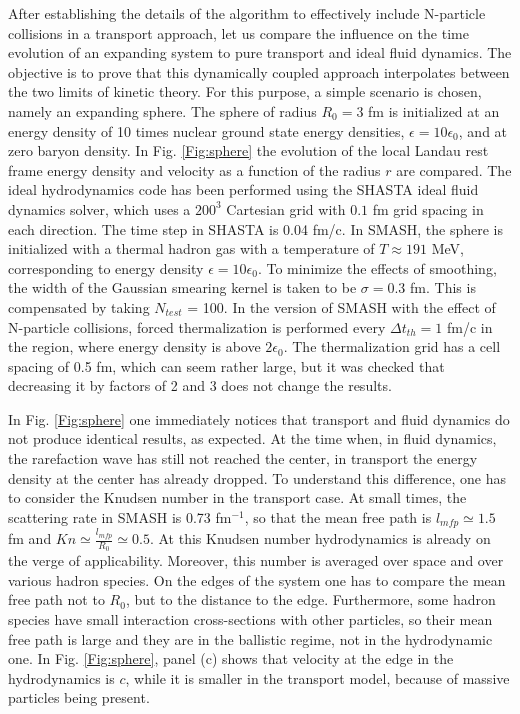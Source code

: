 After establishing the details of the algorithm to effectively include
N-particle collisions in a transport approach, let us compare the influence on the
time evolution of an expanding system to pure transport and ideal fluid
dynamics. The objective is to prove that this dynamically
coupled approach interpolates between the two limits of kinetic theory. For
this purpose, a simple scenario is chosen, namely an expanding sphere. The
sphere of radius $R_0 = 3$ fm is initialized at an energy density of 10 times
nuclear ground state energy densities, $\epsilon = 10\epsilon_0$, and at zero
baryon density. In Fig. \ref{Fig:sphere} the evolution of the local Landau rest
frame energy density and velocity as a function of the radius $r$ are compared.
The ideal hydrodynamics code has been performed using the SHASTA
\cite{Rischke:1995ir} ideal fluid dynamics solver, which uses a $200^3$
Cartesian grid with $0.1$ fm grid spacing in each direction. The time step in
SHASTA is 0.04 fm/c. In SMASH, the sphere is initialized with a thermal hadron
gas with a temperature of $T \approx 191$ MeV, corresponding to energy density
$\epsilon = 10\epsilon_0$. To minimize the effects of smoothing, the
width of the Gaussian smearing kernel is taken to be $\sigma = 0.3$ fm. This is
compensated by taking $N_{test}$ = 100. In the version of SMASH with the effect of
N-particle collisions, forced thermalization is performed every $\Delta t_{th} = 1$
fm/c in the region, where energy density is above $2\epsilon_0$. The thermalization
grid has a cell spacing of 0.5 fm, which can seem rather large, but it was
checked that decreasing it by factors of 2 and 3 does not change the results. 

In Fig. \ref{Fig:sphere} one immediately notices that transport and fluid
dynamics do not produce identical results, as expected. At the time when, in
fluid dynamics, the rarefaction wave has still not reached the center, in
transport the energy density at the center has already dropped. To understand
this difference, one has to consider the Knudsen number in the transport case.
At small times, the scattering rate in SMASH is 0.73 fm$^{-1}$, so that the
mean free path is $l_{mfp} \simeq 1.5$ fm and $Kn \simeq \frac{l_{mfp}}{R_0}
\simeq 0.5$. At this Knudsen number hydrodynamics is already on the verge of
applicability. Moreover, this number is averaged over space and over various
hadron species. On the edges of the system one has to compare the mean free
path not to $R_0$, but to the distance to the edge. Furthermore, some hadron
species have small interaction cross-sections with other particles, so their
mean free path is large and they are in the ballistic regime, not in the
hydrodynamic one. In Fig. \ref{Fig:sphere}, panel (c) shows that velocity at
the edge in the hydrodynamics is $c$, while it is smaller in the transport
model, because of massive particles being present.

